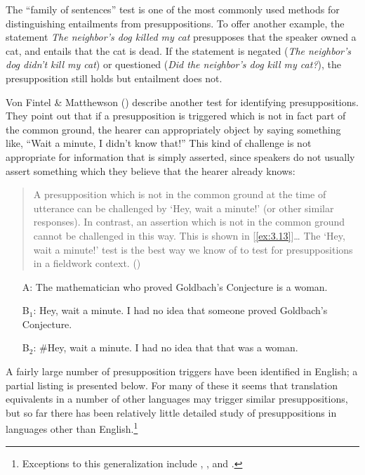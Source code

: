 The “family of sentences” test is one of the most commonly used methods for distinguishing entailments from presuppositions. To offer another example, the statement \textit{The neighbor’s dog killed my cat} presupposes that the speaker owned a cat, and entails that the cat is dead. If the statement is negated (\textit{The neighbor’s dog didn’t kill my cat}) or questioned (\textit{Did the neighbor’s dog kill my cat?}), the presupposition still holds but entailment does not.



Von Fintel \& Matthewson (\citeyear{vonFintelMatthewson2008}) describe another test for identifying presuppositions. They point out that if a presupposition is triggered which is not in fact part of the common ground, the hearer can appropriately object by saying something like, “Wait a minute, I didn’t know that!” This kind of challenge is not appropriate for information that is simply asserted, since speakers do not usually assert something which they believe that the hearer already knows:


\begin{quote}
A presupposition which is not in the common ground at the time of utterance can be challenged by ‘Hey, wait a minute!’ (or other similar responses). In contrast, an assertion which is not in the common ground cannot be challenged in this way. This is shown in [\ref{ex:3.13}]… The ‘Hey, wait a minute!’ test is the best way we know of to test for presuppositions in a fieldwork context. (\citealt{vonFintelMatthewson2008})\\
\end{quote}

\ea \label{ex:3.13}
\begin{itemize}
\item[A:] The mathematician who proved Goldbach’s Conjecture is a woman.\\
\item[B$_1$:] Hey, wait a minute. I had no idea that someone proved Goldbach’s Conjecture.\\
\item[B$_2$:] \#Hey, wait a minute. I had no idea that that was a woman.
\end{itemize}
\z


A fairly large number of presupposition triggers have been identified in English; a partial listing is presented below. For many of these it seems that translation equivalents in a number of other languages may trigger similar presuppositions, but so far there has been relatively little detailed study of presuppositions in languages other than English.\footnote{Exceptions to this generalization include \citet{LevinsonAnnamalai1992}, \citet{Matthewson2006}, and \citet{TonhauserEtAl2013}.}


